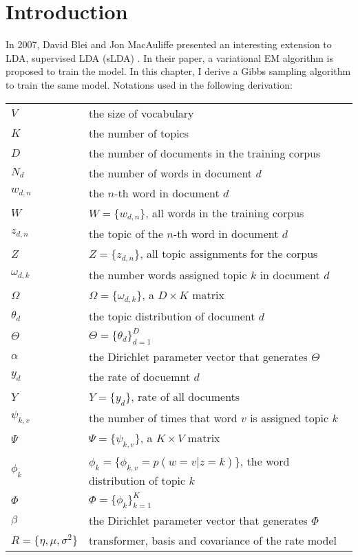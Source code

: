 
\section{Introduction}

In 2007, David Blei and Jon MacAuliffe presented an interesting
extension to LDA, supervised LDA (sLDA) \cite{slda}.  In their paper,
a variational EM algorithm is proposed to train the model.  In this
chapter, I derive a Gibbs sampling algorithm to train the same model.
Notations used in the following
derivation:
\begin{table}[!h]
  \centering
  \begin{tabular}{ll}
    $V$ & the size of vocabulary \\
    $K$ & the number of topics \\
    $D$ & the number of documents in the training corpus \\
    $N_d$ & the number of words in document $d$ \\
    $w_{d,n}$ & the $n$-th word in document $d$ \\
    $W$ & $W=\{w_{d,n}\}$, all words in the training corpus \\
    $z_{d,n}$ & the topic of the $n$-th word in document $d$ \\
    $Z$ & $Z=\{z_{d,n}\}$, all topic assignments for the corpus \\
    $\omega_{d,k}$ & the number words assigned topic $k$ in document $d$ \\
    $\Omega$ & $\Omega=\{\omega_{d,k}\}$, a $D\times{}K$ matrix \\
    $\theta_d$ & the topic distribution of document $d$ \\
    $\Theta$ & $\Theta=\{\theta_d\}_{d=1}^D$ \\
    $\alpha$ & the Dirichlet parameter vector that generates $\Theta$ \\
    $y_d$ & the rate of docuemnt $d$ \\
    $Y$ & $Y=\{y_d\}$, rate of all documents \\
    $\psi_{k,v}$ & the number of times that word $v$ is assigned topic $k$ \\
    $\Psi$ & $\Psi=\{\psi_{k,v}\}$, a $K\times{}V$ matrix \\
    $\phi_k$ & $\phi_k=\{\phi_{k,v}=p(w=v|z=k)\}$, the word distribution of topic $k$ \\
    $\Phi$ & $\Phi=\{\phi_k\}_{k=1}^K$ \\
    $\beta$ & the Dirichlet parameter vector that generates $\Phi$ \\
    $R=\{\eta, \mu, \sigma^2\}$ & transformer, basis and covariance of the
    rate model \\
  \end{tabular}
\end{table}

